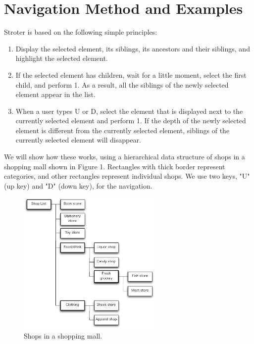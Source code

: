 \documentclass{article}
\begin{document}

\section*{Navigation Method and Examples}

Stroter is based on the following simple principles:

\begin{enumerate}
\item Display the selected element, its siblings, its ancestors and their siblings,
and highlight the selected element.
\item If the selected element has children, wait for a little moment,
select the first child, and perform 1.
As a result, all the siblings of the newly selected element appear in the list.
\item When a user types U or D, select the element that is displayed next to the currently
selected element and perform 1.
If the depth of the newly selected element is different from the currently
selected element, siblings of the currently selected element will disappear.
\end{enumerate}

We will show how these works, using a hierarchical data structure of
shops in a shopping mall shown in Figure 1.
Rectangles with thick border represent categories, and
other rectangles represent individual shops.
We use two keys, "U" (up key) and "D" (down key), for the navigation.

\begin{figure}[H]
\centerline{\includegraphics[width=70mm,bb=0 0 490 490]{figures/fig1.pdf}}
\caption{Shops in a shopping mall.}
\label{fig1}
\end{figure}
\end{document}
